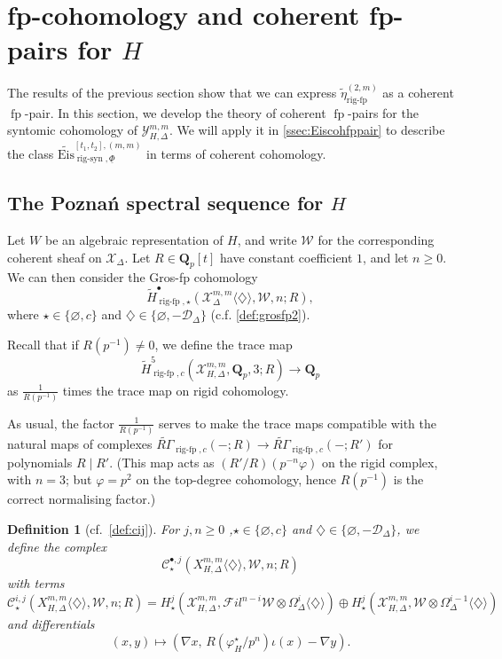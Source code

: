 \documentclass[cjm]{ipart}
\theoremstyle{plain}
\newtheorem{definition}[theorem]{Definition}
\theoremstyle{remark}
\DeclareMathOperator{\fp}{fp}
\DeclareMathOperator{\rigfp}{rig-fp}
\DeclareMathOperator{\rigsyn}{rig-syn}
\newcommand{\Eis}{\mathrm{Eis}}
\newcommand{\QQ}{\mathbf{Q}}
\newcommand{\Qp}{\QQ_p}
\newcommand{\RGt}{\widetilde{R\Gamma}}
\newcommand{\cD}{\mathcal{D}}
\newcommand{\cW}{\mathcal{W}}
\newcommand{\cX}{\mathcal{X}}
\newcommand{\cY}{\mathcal{Y}}
\newcommand{\sC}{\mathscr{C}}
\newcommand{\sFil}{{\mathscr Fil}}
\newcommand{\wH}{\widetilde{H}}
\numberwithin{equation}{subsection}
\renewcommand{\geq}{\geqslant}
\renewcommand{\emptyset}{\varnothing}
\begin{document}

\section{fp-cohomology and coherent fp-pairs for \texorpdfstring{$H$}{H}}\label{section:PoznanforH}

  The results of the previous section show that we can express $\tilde\eta^{(2,m)}_{\rigfp}$ as a coherent $\fp$-pair. In this section, we develop the theory of coherent $\fp$-pairs for the syntomic cohomology of $\cY^{m,m}_{H,\Delta}$. We will apply it in  \cref{ssec:Eiscohfppair} to describe the class $\widetilde{\Eis}^{[t_1,t_2],(m,m)}_{\rigsyn,\underline{\Phi}}$ in terms of coherent cohomology.

 \subsection{The Pozna\'n spectral sequence for $H$}

  Let $W$ be an algebraic representation of $H$, and write $\cW$ for the corresponding coherent sheaf on $\cX_\Delta$. Let  $R\in\Qp[t]$ have constant coefficient $1$, and let $n\geq 0$.  We can then consider the Gros-fp cohomology
  \[  \wH^\bullet_{\rigfp,\star}(\cX^{m,m}_\Delta\langle \diamondsuit\rangle,\cW,n; R), \]
  where $\star\in\{ \varnothing,c\}$ and $\diamondsuit\in\{\varnothing,-\cD_\Delta\}$ (c.f. \cref{def:grosfp2}).



   Recall that if $R(p^{-1}) \ne 0$, we define the trace map
   \[ \wH^5_{\rigfp,c}(\cX^{m,m}_{H,\Delta},\Qp, 3; R) \to \Qp \]
   as $\tfrac{1}{R(p^{-1})}$ times the trace map on rigid cohomology.

  \begin{remark}
   As usual, the factor $\tfrac{1}{R(p^{-1})}$ serves to make the trace maps compatible with the natural maps of complexes $\RGt_{\rigfp,c}(-; R) \to \RGt_{\rigfp,c}(-; R')$ for polynomials $R \mid R'$. (This map acts as $(R'/R)(p^{-n} \varphi)$ on the rigid complex, with $n = 3$; but $\varphi = p^2$ on the top-degree cohomology, hence $R(p^{-1})$ is the correct normalising factor.)
  \end{remark}

  \begin{definition}[{cf.~\cref{def:cij}}]
   For $j,n\geq 0$ ,$\star\in\{\emptyset, c\}$ and $\diamondsuit\in\{\varnothing,-\cD_\Delta\}$, we define the complex
   \[ \sC^{\bullet,j}_{\star}(X_{H,\Delta}^{m,m}\langle \diamondsuit\rangle, \cW,n;R)\]
   with terms
   \[ \sC^{i,j}_{\star}(X_{H,\Delta}^{m,m}\langle \diamondsuit\rangle, \cW,n;R)= H^j_\star(\cX_{H,\Delta}^{m,m},\sFil^{n-i}\cW\otimes\Omega_\Delta^i\langle \diamondsuit\rangle)\oplus H^j_\star(\cX_{H,\Delta}^{m,m},\cW\otimes\Omega_\Delta^{i-1}\langle \diamondsuit\rangle)\]
   and differentials
   \[ (x,y)\mapsto \left(\nabla x,\, R(\varphi_H^\star/p^n)\iota(x)-\nabla y\right).  \]
  \end{definition}
\end{document}
